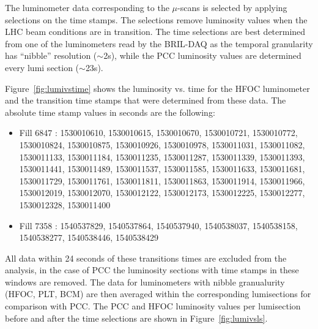 
The luminometer data corresponding to the $\mu$-scans is selected by applying selections on the time stamps.
The selections remove luminosity values when the LHC beam conditions are in transition.
The time selections are best determined from one of the luminometers read by the BRIL-DAQ as the temporal granularity has ``nibble'' resolution ($\sim$2s), while the PCC luminosity values are determined every lumi section ($\sim$23s).

Figure~\ref{fig:lumivstime} shows the luminosity vs. time for the HFOC luminometer and the transition time stamps that were determined from these data.
The absolute time stamp values in seconds are the following:
\begin{itemize}
\item Fill 6847 : 1530010610, 1530010615, 1530010670, 1530010721, 1530010772, 1530010824, 1530010875, 1530010926, 1530010978, 1530011031, 1530011082, 1530011133, 1530011184, 1530011235, 1530011287, 1530011339, 1530011393, 1530011441, 1530011489, 1530011537, 1530011585, 1530011633, 1530011681, 1530011729, 1530011761, 1530011811, 1530011863, 1530011914, 1530011966, 1530012019, 1530012070, 1530012122, 1530012173, 1530012225, 1530012277, 1530012328, 1530011400
\item Fill 7358 : 1540537829, 1540537864, 1540537940, 1540538037, 1540538158, 1540538277, 1540538446, 1540538429
\end{itemize}

All data  within 24 seconds of these transitions times are excluded from the analysis, in the case of PCC the luminosity sections with time stamps in these windows are removed.
The data for luminometers with nibble granualurity (HFOC, PLT, BCM) are then averaged within the corresponding  lumisections for comparison with PCC. 
The PCC and HFOC luminosity values per lumisection before and after the time selections are shown in Figure~\ref{fig:lumivsls}.


